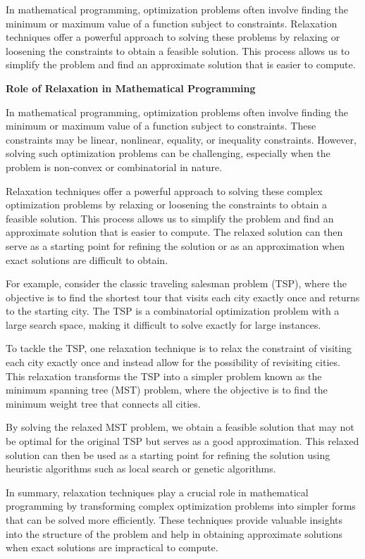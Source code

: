 \documentclass[12pt]{book} %
\begin{document}
In mathematical programming, optimization problems often involve finding the minimum or maximum value of a function subject to constraints. Relaxation techniques offer a powerful approach to solving these problems by relaxing or loosening the constraints to obtain a feasible solution. This process allows us to simplify the problem and find an approximate solution that is easier to compute.

\textbf{Role of Relaxation in Mathematical Programming}

In mathematical programming, optimization problems often involve finding the minimum or maximum value of a function subject to constraints. These constraints may be linear, nonlinear, equality, or inequality constraints. However, solving such optimization problems can be challenging, especially when the problem is non-convex or combinatorial in nature.

Relaxation techniques offer a powerful approach to solving these complex optimization problems by relaxing or loosening the constraints to obtain a feasible solution. This process allows us to simplify the problem and find an approximate solution that is easier to compute. The relaxed solution can then serve as a starting point for refining the solution or as an approximation when exact solutions are difficult to obtain.

For example, consider the classic traveling salesman problem (TSP), where the objective is to find the shortest tour that visits each city exactly once and returns to the starting city. The TSP is a combinatorial optimization problem with a large search space, making it difficult to solve exactly for large instances.

To tackle the TSP, one relaxation technique is to relax the constraint of visiting each city exactly once and instead allow for the possibility of revisiting cities. This relaxation transforms the TSP into a simpler problem known as the minimum spanning tree (MST) problem, where the objective is to find the minimum weight tree that connects all cities.

By solving the relaxed MST problem, we obtain a feasible solution that may not be optimal for the original TSP but serves as a good approximation. This relaxed solution can then be used as a starting point for refining the solution using heuristic algorithms such as local search or genetic algorithms.

In summary, relaxation techniques play a crucial role in mathematical programming by transforming complex optimization problems into simpler forms that can be solved more efficiently. These techniques provide valuable insights into the structure of the problem and help in obtaining approximate solutions when exact solutions are impractical to compute.
\end{document}
